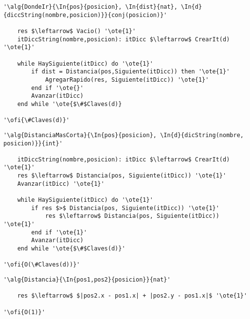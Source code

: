 \begin{lstlisting}[mathescape]
'\alg{DondeIr}{\In{pos}{posicion}, \In{dist}{nat}, \In{d}{diccString(nombre,posicion)}}{conj(posicion)}'

	res $\leftarrow$ Vacio() '\ote{1}'
	itDiccString(nombre,posicion): itDicc $\leftarrow$ CrearIt(d) '\ote{1}'

	while HaySiguiente(itDicc) do '\ote{1}'
		if dist = Distancia(pos,Siguiente(itDicc)) then '\ote{1}'
			AgregarRapido(res, Siguiente(itDicc)) '\ote{1}'
		end if '\ote{}'
		Avanzar(itDicc)
	end while '\ote{$\#$Claves(d)}

'\ofi{\#Claves(d)}'
\end{lstlisting}

\begin{lstlisting}[mathescape]
'\alg{DistanciaMasCorta}{\In{pos}{posicion}, \In{d}{dicString(nombre, posicion)}}{int}'
	
	itDiccString(nombre,posicion): itDicc $\leftarrow$ CrearIt(d) '\ote{1}'
	res $\leftarrow$ Distancia(pos, Siguiente(itDicc)) '\ote{1}'
	Avanzar(itDicc) '\ote{1}'

	while HaySiguiente(itDicc) do '\ote{1}'
		if res $>$ Distancia(pos, Siguiente(itDicc)) '\ote{1}'
			res $\leftarrow$ Distancia(pos, Siguiente(itDicc)) '\ote{1}'
		end if '\ote{1}'
		Avanzar(itDicc)
	end while '\ote{$\#$Claves(d)}'

'\ofi{O(\#Claves(d))}'
\end{lstlisting}

\begin{lstlisting}[mathescape]
'\alg{Distancia}{\In{pos1,pos2}{posicion}}{nat}'

	res $\leftarrow$ $|pos2.x - pos1.x| + |pos2.y - pos1.x|$ '\ote{1}'

'\ofi{O(1)}'
\end{lstlisting}

